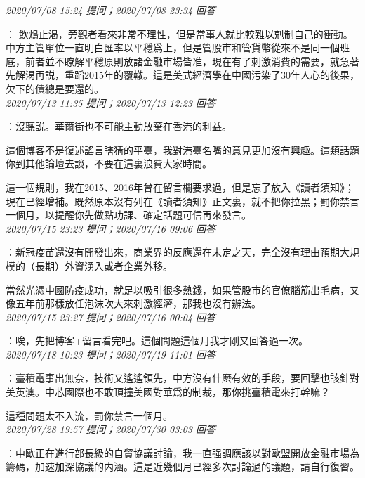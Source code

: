 \documentclass[twocolumn]{ctexart}
\begin{document}
\textit{\hfill\noindent\small 2020/07/08 15:24 提问；2020/07/08 23:34 回答}

：
飲鴆止渴，旁觀者看來非常不理性，但是當事人就比較難以剋制自己的衝動。 
中方主管單位一直明白匯率以平穩爲上，但是管股市和管貨幣從來不是同一個班底，前者並不瞭解平穩原則放諸金融市場皆准，現在有了刺激消費的需要，就急著先解渴再説，重蹈2015年的覆轍。這是美式經濟學在中國污染了30年人心的後果，欠下的債總是要還的。
\\

\textit{\hfill\noindent\small 2020/07/13 11:35 提问；2020/07/13 12:23 回答}

：沒聽説。華爾街也不可能主動放棄在香港的利益。

這個博客不是復述謠言瞎猜的平臺，我對港臺名嘴的意見更加沒有興趣。這類話題你到其他論壇去談，不要在這裏浪費大家時間。

這一個規則，我在2015、2016年曾在留言欄要求過，但是忘了放入《讀者須知》；現在已經增補。既然原本沒有列在《讀者須知》正文裏，就不把你拉黑；罰你禁言一個月，以提醒你先做點功課、確定話題可信再來發言。
\\

\textit{\hfill\noindent\small 2020/07/15 23:23 提问；2020/07/16 09:06 回答}

：新冠疫苗還沒有開發出來，商業界的反應還在未定之天，完全沒有理由預期大規模的（長期）外資湧入或者企業外移。

當然光憑中國防疫成功，就足以吸引很多熱錢，如果管股市的官僚腦筋出毛病，又像五年前那樣放任泡沫吹大來刺激經濟，那我也沒有辦法。
\\

\textit{\hfill\noindent\small 2020/07/15 23:27 提问；2020/07/16 00:04 回答}

：唉，先把博客+留言看完吧。這個問題這個月我才剛又回答過一次。
\\

\textit{\hfill\noindent\small 2020/07/18 10:23 提问；2020/07/19 11:01 回答}

：臺積電事出無奈，技術又遙遙領先，中方沒有什麽有效的手段，要回擊也該針對美英澳。中芯國際也不敢頂撞美國對華爲的制裁，那你挑臺積電來打幹嘛？

這種問題太不入流，罰你禁言一個月。
\\

\textit{\hfill\noindent\small 2020/07/28 19:57 提问；2020/07/30 03:03 回答}

：中歐正在進行部長級的自貿協議討論，我一直强調應該以對歐盟開放金融市場為籌碼，加速加深協議的内涵。這是近幾個月已經多次討論過的議題，請自行復習。
\\
\end{document}
